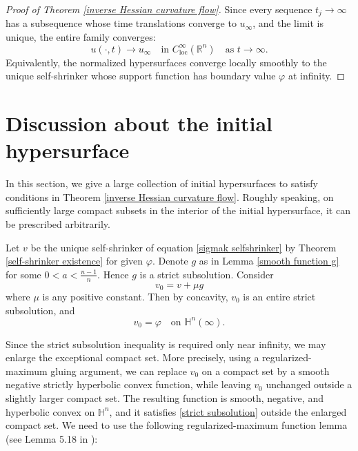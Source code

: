\documentclass[reqno]{amsart}
\theoremstyle{remark}
\theoremstyle{definition}
\numberwithin{equation}{section}
\begin{document}
\begin{proof}[Proof of Theorem \ref{inverse Hessian curvature flow}]
    Since every sequence $t_j\to\infty$ has a subsequence whose time translations converge to $u_\infty$, and the limit is unique, the entire family converges:
    \begin{equation}
    u(\cdot,t)\longrightarrow u_\infty \quad \text{in }C^\infty_{\mathrm{loc}}(\mathbb{R}^n) \quad \text{as }t\to\infty.
    \end{equation}
    Equivalently, the normalized hypersurfaces converge locally smoothly to the unique self-shrinker whose support function has boundary value $\varphi$ at infinity.
\end{proof}


\section{Discussion about the initial hypersurface}

In this section, we give a large collection of initial hypersurfaces to satisfy conditions in Theorem  \ref{inverse Hessian curvature flow}. Roughly speaking, on sufficiently large compact subsets in the interior of the initial hypersurface, it can be prescribed arbitrarily.


Let $v$ be the unique self-shrinker of equation \eqref{sigmak selfshrinker} by Theorem \ref{self-shrinker existence} for given $\varphi$. Denote $g$ as in Lemma \ref{smooth function g} for some $0 < a < \frac{n-1}{n}$. Hence $g$ is a strict subsolution. Consider 
\begin{equation}\label{v_0}
v_0 =  v + \mu g
\end{equation}
where $\mu$ is any positive constant. Then by concavity, $v_0$ is an entire strict subsolution, and
\[
v_0 = \varphi \quad \text{on } \mathbb{H}^n(\infty).
\]

Since the strict subsolution inequality is required only near infinity, we may enlarge the exceptional compact set. More precisely, using a regularized-maximum gluing argument, we can replace $v_0$ on a compact set by a smooth negative strictly hyperbolic convex function, while leaving $v_0$ unchanged outside a slightly larger compact set. The resulting function is smooth, negative, and hyperbolic convex on $\mathbb{H}^n$, and it  satisfies \eqref{strict subsolution} outside the enlarged compact set. We need to use the following regularized-maximum function lemma (see Lemma 5.18 in \cite{demailly1997complex}):
\end{document}
